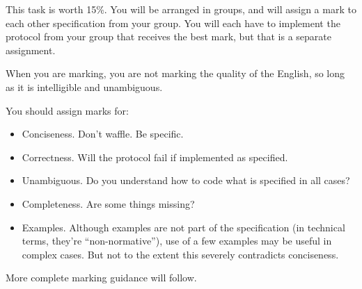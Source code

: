 \documentclass{article}
\begin{document}
This task is worth 15\%.  You will be arranged in groups, and will
assign a mark to each other specification from your group.  You will each have
to implement the protocol from your group that receives the best mark, but that is a separate assignment.

When you are marking, you are not marking the quality of the English,
so long as it is intelligible and unambiguous.

You should assign marks for:
\begin{itemize}
  \item Conciseness.  Don't waffle.  Be specific.
  \item Correctness.  Will the protocol fail if implemented as specified.
  \item  Unambiguous.  Do you understand how to code what is specified in all cases?
  \item  Completeness. Are some things missing?
  \item  Examples. Although examples are not part of the specification (in technical terms, they're ``non-normative''), use of a few examples may be useful in complex cases.  But not to the extent this severely contradicts conciseness.
\end{itemize}

More complete marking guidance will follow.
\end{document}
